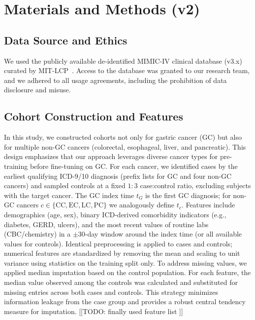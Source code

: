 \documentclass[journal,article,submit,pdftex,moreauthors]{Definitions/mdpi}
\begin{document}


\section{Materials and Methods (v2)}

\subsection{Data Source and Ethics}
We used the publicly available de-identified MIMIC-IV clinical database (v3.x) curated by MIT-LCP~\citep{Johnson2023_MIMICIV}.
Access to the database was granted to our research team, and we adhered to all usage agreements, including the prohibition of data disclosure and misuse.

\subsection{Cohort Construction and Features}
In this study, we constructed cohorts not only for gastric cancer (GC) but also for multiple non-GC cancers (colorectal, esophageal, liver, and pancreatic).
This design emphasizes that our approach leverages diverse cancer types for pre-training before fine-tuning on GC.
For each cancer, we identified cases by the earliest qualifying ICD-9/10 diagnosis (prefix lists for GC and four non-GC cancers) and sampled controls at a fixed $1{:}3$ case:control ratio, excluding subjects with the target cancer.
The GC index time $t_G$ is the first GC diagnosis; for non-GC cancers $c\in\{\mathrm{CC},\mathrm{EC},\mathrm{LC},\mathrm{PC}\}$ we analogously define $t_c$.
Features include demographics (age, sex), binary ICD-derived comorbidity indicators (e.g., diabetes, GERD, ulcers), and the most recent values of routine labs (CBC/chemistry) in a $\pm 30$-day window around the index time (or all available values for controls).
Identical preprocessing is applied to cases and controls; numerical features are standardized by removing the mean and scaling to unit variance using statistics on the training split only.
To address missing values, we applied median imputation based on the control population. 
For each feature, the median value observed among the controls was calculated and substituted for missing entries across both cases and controls. 
This strategy minimizes information leakage from the case group and provides a robust central tendency measure for imputation.
[[TODO: finally used feature list ]]
\end{document}
